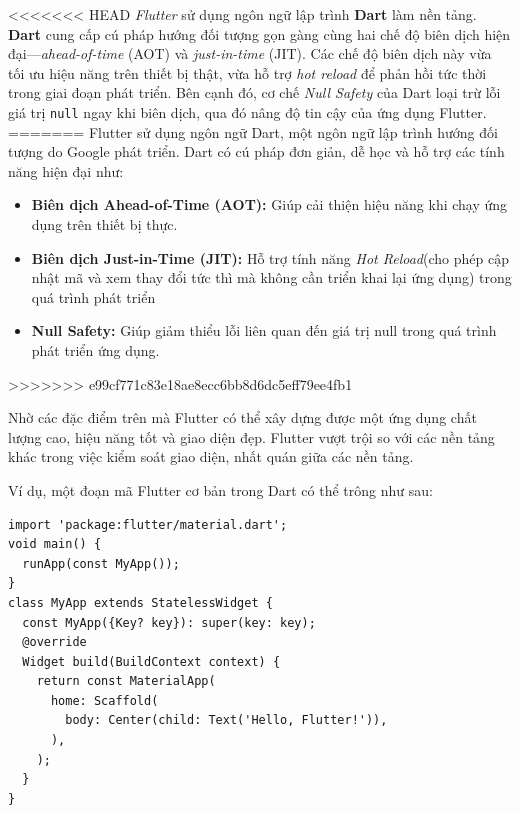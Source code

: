 \documentclass[../DoAn.tex]{subfiles}
\numberwithin{figure}{chapter}
\begin{document}
<<<<<<< HEAD
\textit{Flutter} sử dụng ngôn ngữ lập trình \textbf{Dart} làm nền tảng. \textbf{Dart} cung cấp cú pháp hướng đối tượng gọn gàng cùng hai chế độ biên dịch hiện đại—\emph{ahead-of-time} (AOT) và \emph{just-in-time} (JIT). Các chế độ biên dịch này vừa tối ưu hiệu năng trên thiết bị thật, vừa hỗ trợ \emph{hot reload} để phản hồi tức thời trong giai đoạn phát triển. Bên cạnh đó, cơ chế \emph{Null Safety} của Dart loại trừ lỗi giá trị \texttt{null} ngay khi biên dịch, qua đó nâng độ tin cậy của ứng dụng Flutter.
=======
Flutter sử dụng ngôn ngữ Dart, một ngôn ngữ lập trình hướng đối tượng do Google phát triển. Dart có cú pháp đơn giản, dễ học và hỗ trợ các tính năng hiện đại như:
\begin{itemize}
    \item \textbf{Biên dịch Ahead-of-Time (AOT):} Giúp cải thiện hiệu năng khi chạy ứng dụng trên thiết bị thực.
    \item \textbf{Biên dịch Just-in-Time (JIT):} Hỗ trợ tính năng \textit{Hot Reload}(cho phép cập nhật mã và xem thay đổi tức thì mà không cần triển khai lại ứng dụng) trong quá trình phát triển
    \item \textbf{Null Safety:} Giúp giảm thiểu lỗi liên quan đến giá trị null trong quá trình phát triển ứng dụng.
\end{itemize}
>>>>>>> e99cf771c83e18ae8ecc6bb8d6dc5eff79ee4fb1

Nhờ các đặc điểm trên mà Flutter có thể xây dựng được một ứng dụng chất lượng cao, hiệu năng tốt và giao diện đẹp. Flutter vượt trội so với các nền tảng khác trong việc kiểm soát giao diện, nhất quán giữa các nền tảng.

Ví dụ, một đoạn mã Flutter cơ bản trong Dart có thể trông như sau:
\begin{lstlisting}
import 'package:flutter/material.dart';
void main() {
  runApp(const MyApp());
}
class MyApp extends StatelessWidget {
  const MyApp({Key? key}): super(key: key);
  @override
  Widget build(BuildContext context) {
    return const MaterialApp(
      home: Scaffold(
        body: Center(child: Text('Hello, Flutter!')),
      ),
    );
  }
}
\end{lstlisting}
\end{document}
